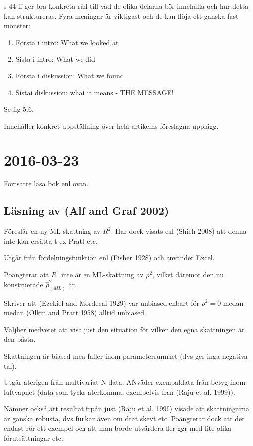 \documentclass[]{article}
\providecommand{\tightlist}{%
  \setlength{\itemsep}{0pt}\setlength{\parskip}{0pt}}
\begin{document}
s 44 ff ger bra konkreta råd till vad de olika delarna bör innehålla och
hur detta kan struktureras. Fyra meningar är viktigast och de kan flöja
ett ganska fast mönster:

\begin{enumerate}
\def\labelenumi{\arabic{enumi}.}
\tightlist
\item
  Första i intro: What we looked at
\item
  Sista i intro: What we did
\item
  Första i diskussion: What we found
\item
  Sistai diskussion: what it means - THE MESSAGE!
\end{enumerate}

Se fig 5.6.

Innehåller konkret uppställning över hela artikelns föreslagna upplägg.

\section{2016-03-23}\label{section-2}

Fortsatte läsa bok enl ovan.

\subsection{Läsning av (Alf and Graf 2002)}\label{lasning-av-alf2002}

Föreslår en ny ML-skattning av \(R^2\). Har dock visats enl (Shieh 2008)
att denna inte kan ersätta t ex Pratt etc.

Utgår från fördelningsfunktion enl (Fisher 1928) och använder Excel.

Poängterar att \(R^^2\) inte är en ML-skattning av \(\rho^2\), vilket
däremot den nu konstruerade \(\hat{\rho}^2_{(ML)}\) är.

Skriver att (Ezekiel and Mordecai 1929) var unbiased enbart för
\(\rho^2=0\) medan medan (Olkin and Pratt 1958) alltid unbiased.

Väljher medvetet att visa just den situation för vilken den egna
skattningen är den bästa.

Skattningen är biased men faller inom parameterrummet (dvs ger inga
negativa tal).

Utgår återigen från multivariat N-data. ANväder exempaldata från betyg
inom luftvapnet (data som tycks återkomma, exempelvis från (Raju et al.
1999)).

Nämner också att resultat frpån just (Raju et al. 1999) visade att
skattningarna är ganska robusta, dvs funkar även om dtat skevt etc.
Poängterar dock att det endast rör ett exempel och att man borde
utvärdera fler ggr med lite olika förutsättningar etc.
\end{document}
